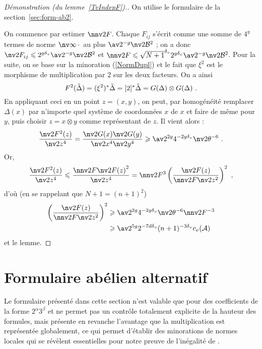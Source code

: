 \begin{proof}[Démonstration (du lemme~\vref{TvIndepF}).]
  On utilise le formulaire de la section~\vref{sec:form-ab2}.

  On commence par estimer \( \nnv2{F} \). Chaque \( F_{ij} \) s'écrit comme
  une somme de \( 4^g \) termes de norme \( \nv\infty{\truc} \) au plus
  \( \av 2^{-g} \nv2 \vai^2 \) ; on a donc \( \nv2 {F_{ij}} \le 2^{g\dv} \av 2
    ^{-g} \nv2 \vai ^2 \) et \( \nnv2 F \le  \sqrt{N+1}^\dv 2^{g\dv} \av 2
    ^{-g} \nv2 \vai ^2 \). Pour la suite, on se base sur la minoration
  (\vref{NormDupl}) et le fait que \( \xi^2 \) est le morphisme de
  multiplication par \( 2 \) sur les deux facteurs. On a ainsi
  \begin{equation}
    F^2(\tilde\Delta)
    = (\xi^2)^*\tilde\Delta
    = [2]^* \tilde\Delta = G(\Delta) \otimes G(\Delta)
    \text{ .}
  \end{equation}
  En appliquant ceci en un point \( z = (x, y) \), on peut, par
  homogénéité remplacer \( \Delta(x) \) par n'importe quel système de
  coordonnées \( x \) de \( x \) et faire de même pour \( y \), puis
  choisir \( z = x \otimes y \) comme représentant de \( z \). Il vient
  alors :
  \begin{equation}
    \frac {\nv2{F^2(z)}} {\nv2 z ^4}
    = \frac {\nv2{G(x)} \nv2{G(y)}} {\nv2 x ^4 \nv2 y ^4}
    \ge \av 2 ^{2g} 4^{-2g\dv} \nv2\coa ^{-6}
    \pmm.
  \end{equation}
  Or,
  \begin{equation}
    \frac {\nv2{F^2(z)}} {\nv2 z ^4}
    \le \frac {\nnv2 F \nv2{F(z)}^2} {\nv2 z ^4}
    = \nnv2 F ^3 \left( \frac {\nv2{F(z)}} {\nnv2 F \nv2 z ^2} \right) ^2
    \pmm,
  \end{equation}
  d'où (en se rappelant que \( N+1 = (n+1)^2 \))
  \begin{align*}
    \left(\frac {\nv2{F(z)}} {\nnv2 F \nv2 z ^2} \right)^2
    & \ge \av2^{2g} 4^{-2g\dv} \nv2\coa^{-6} \nnv2 F ^{-3} \\
    & \ge \av2^{5g} 2^{-7d\dv} (n+1)^{-3\dv} c_v(\va)
  \end{align*}
  et le lemme.
\end{proof}

\stopout



\section{Formulaire abélien alternatif}
\label{sec:form-ab-alt}

Le formulaire présenté dans cette section n'est valable que pour des
coefficients de la forme \( 2^\alpha 3^\beta \) et ne permet pas un contrôle
totalement explicite de la hauteur des formules, mais présente en revanche
l'avantage que la multiplication est représentée globalement, ce qui permet
d'établir des minorations de normes locales qui se révèlent essentielles pour
notre preuve de l'inégalité de .

